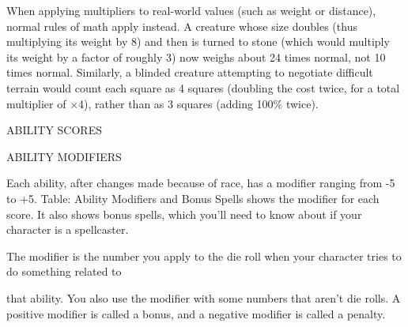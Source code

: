 \documentclass{article}
\begin{document}
\vspace{12pt}
When applying multipliers to real-world values (such as weight or distance), normal 
rules of math apply instead. A creature whose size doubles (thus multiplying its 
weight by 8) and then is turned to stone (which would multiply its weight by a 
factor of roughly 3) now weighs about 24 times normal, not 10 times normal. Similarly, 
a blinded creature attempting to negotiate difficult terrain would count each square 
as 4 squares (doubling the cost twice, for a total multiplier of \ensuremath{\times}4), 
rather than as 3 squares (adding 100\% twice). 

\vspace{12pt}
{\LARGE{}ABILITY SCORES}

\vspace{12pt}
ABILITY MODIFIERS

Each ability, after changes made because of race, has a modifier ranging from -5 
to +5. Table: Ability Modifiers and Bonus Spells shows the modifier for each score. 
It also shows bonus spells, which you'll need to know about if your character is 
a spellcaster.

The modifier is the number you apply to the die roll when your character tries 
to do something related to

that ability. You also use the modifier with some numbers that aren't die rolls. 
A positive modifier is called a bonus, and a negative modifier is called a penalty.
\end{document}
